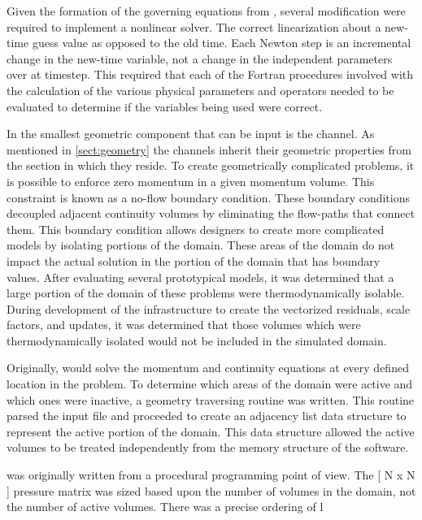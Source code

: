 Given the formation of the governing equations from , several modification were required to implement a nonlinear solver.
The correct linearization about a new-time guess value as opposed to the old time.
Each Newton step is an incremental change in the new-time variable, not a change in the independent parameters over at timestep.
This required that each of the Fortran procedures involved with the calculation of the various physical parameters and operators needed to be evaluated to determine if the variables being used were correct.

In \cobra{} the smallest geometric component that can be input is the channel.
As mentioned in \ref{sect:geometry} the channels inherit their geometric properties from the section in which they reside.
To create geometrically complicated problems, it is possible to enforce zero momentum in a given momentum volume.
This constraint is known as a no-flow boundary condition.
These boundary conditions decoupled adjacent continuity volumes by eliminating the flow-paths that connect them.
This boundary condition allows designers to create more complicated models by isolating portions of the domain.
These areas of the domain do not impact the actual solution in the portion of the domain that has boundary values.
After evaluating several prototypical models, it was determined that a large portion of the domain of these problems were thermodynamically isolable.
During development of the infrastructure to create the vectorized residuals, scale factors, and updates, it was determined that those volumes which were thermodynamically isolated would not be included in the simulated domain.


Originally, \cobra{} would solve the momentum and continuity equations at every defined location in the problem.
To determine which areas of the domain were active and which ones were inactive, a geometry traversing routine was written.
This routine parsed the input file and proceeded to create an adjacency list data structure to represent the active portion of the domain.
This data structure allowed the active volumes to be treated independently from the memory structure of the software.


\cobra{} was originally written from a procedural programming point of view.
The [ N x N ] pressure matrix was sized based upon the number of volumes in the domain, not the number of active volumes.
There was a precise ordering of l

